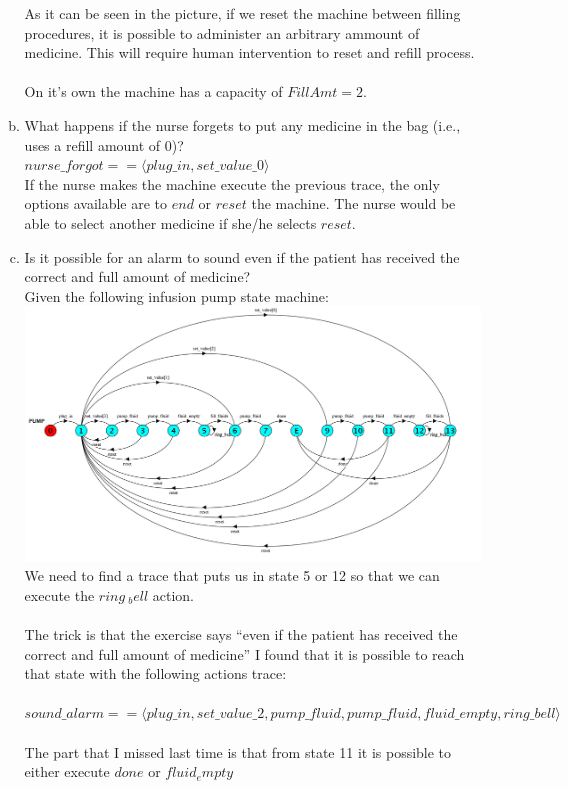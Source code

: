 \documentclass{article}
\begin{document}
\begin{enumerate}[1.]
\begin{enumerate}[a.]
      As it can be seen in the picture, if we reset the machine between filling procedures, it is possible to administer an arbitrary ammount of medicine. This will require human intervention to reset and refill process. \\
      \\
    On it's own the machine has a capacity of $FillAmt=2$. \\  
  \item What happens if the nurse forgets to put any medicine in the bag (i.e., uses a refill amount of 0)? \\
    $ nurse\_forgot == \langle plug\_in, set\_value\_0 \rangle$ \\
    If the nurse makes the machine execute the previous trace, the only options available are to $end$ or $reset$ the machine. The nurse would be able to select another medicine if she/he selects $reset$.
  \item Is it possible for an alarm to sound even if the patient has received the correct and full amount of medicine? \\
    Given the following infusion pump state machine: \\
    \includegraphics[width=6in]{infusion_pump.png} \\
    We need to find a trace that puts us in state 5 or 12 so that we can execute the $ring\ _bell$ action. \\
    \\
    The trick is that the exercise says ``even if the patient has received the correct and full amount of medicine'' I found that it is possible to reach that state with the following actions trace: \\
    \\
    $ sound\_alarm == \langle plug\_in, set\_value\_2, pump\_fluid, pump\_fluid, fluid\_empty, ring\_bell \rangle $ \\
    \\
    The part that I missed last time is that from state 11 it is possible to either execute $done$ or $fluid_empty$ \\
    \end{enumerate}


\end{enumerate}
\end{document}

